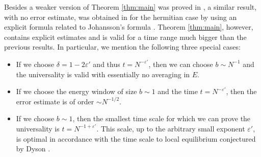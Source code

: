\documentclass[draft]{article}
\newcommand{\e}{\varepsilon}
\numberwithin{equation}{section}
\numberwithin{theorem}{section}
\numberwithin{definition}{section}
\numberwithin{remark}{section}
\begin{document}
\medskip


Besides a weaker version of Theorem \ref{thm:main} was proved in \cite{EYY2},
a similar result, with no error estimate,  was obtained in \cite{EPRSY} for the hermitian case
by using an explicit formula related to 
Johansson's formula \cite{J}.
 Theorem \ref{thm:main}, however,
 contains  explicit estimates 
and is valid for a time range much bigger than the previous results.
In particular,  we mention  the following  
three special cases: 

\begin{itemize}
\item If we  choose $\delta = 1- 2 \e'$ and thus $t = N^{- \e'}$,   
then we can choose $b \sim N^{-1}$ and 
the universality is valid with essentially no averaging in $E$.

\item If we choose  the energy
window of size $b\sim 1$ and the time $t = N^{- \e'}$, then 
the error estimate is of order  $\sim N^{-1/2}$. 


\item  If we choose $b \sim 1$, then the smallest time scale for which
we can prove the universality is 
$t = N^{-1 + \e'}$. This scale, up to the arbitrary small exponent $\e'$, is optimal 
in accordance 
with the time scale to local equilibrium conjectured by Dyson \cite{Dy}.


\end{itemize}
\end{document}
